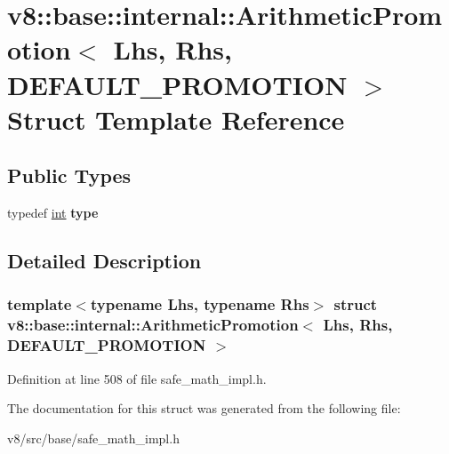 \hypertarget{structv8_1_1base_1_1internal_1_1ArithmeticPromotion_3_01Lhs_00_01Rhs_00_01DEFAULT__PROMOTION_01_4}{}\section{v8\+:\+:base\+:\+:internal\+:\+:Arithmetic\+Promotion$<$ Lhs, Rhs, D\+E\+F\+A\+U\+L\+T\+\_\+\+P\+R\+O\+M\+O\+T\+I\+ON $>$ Struct Template Reference}
\label{structv8_1_1base_1_1internal_1_1ArithmeticPromotion_3_01Lhs_00_01Rhs_00_01DEFAULT__PROMOTION_01_4}
\subsection*{Public Types}
\begin{DoxyCompactItemize}
\item 
\mbox{\label{structv8_1_1base_1_1internal_1_1ArithmeticPromotion_3_01Lhs_00_01Rhs_00_01DEFAULT__PROMOTION_01_4_a3700971f01b0a6dc93a795502bb45cdd}} 
typedef \mbox{\hyperlink{classint}{int}} {\bfseries type}
\end{DoxyCompactItemize}


\subsection{Detailed Description}
\subsubsection*{template$<$typename Lhs, typename Rhs$>$\newline
struct v8\+::base\+::internal\+::\+Arithmetic\+Promotion$<$ Lhs, Rhs, D\+E\+F\+A\+U\+L\+T\+\_\+\+P\+R\+O\+M\+O\+T\+I\+O\+N $>$}



Definition at line 508 of file safe\+\_\+math\+\_\+impl.\+h.



The documentation for this struct was generated from the following file\+:\begin{DoxyCompactItemize}
\item 
v8/src/base/safe\+\_\+math\+\_\+impl.\+h\end{DoxyCompactItemize}
